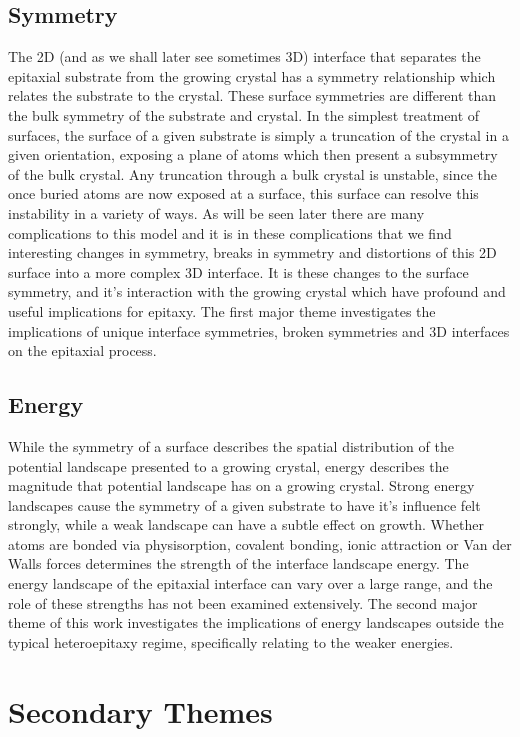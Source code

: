 \subsection{Symmetry} The 2D (and as we shall later see sometimes 3D) interface that separates the epitaxial substrate from the growing crystal has a symmetry relationship which relates the substrate to the crystal.
These surface symmetries are different than the bulk symmetry of the substrate and crystal.
In the simplest treatment of surfaces, the surface of a given substrate is simply a truncation of the crystal in a given orientation, exposing a plane of atoms which then present a subsymmetry of the bulk crystal.
Any truncation through a bulk crystal is unstable, since the once buried atoms are now exposed at a surface, this surface can resolve this instability in a variety of ways.
As will be seen later there are many complications to this model and it is in these complications that we find interesting changes in symmetry, breaks in symmetry and distortions of this 2D surface into a more complex 3D interface.
It is these changes to the surface symmetry, and it's interaction with the growing crystal which have profound and useful implications for epitaxy.
The first major theme investigates the implications of unique interface symmetries, broken symmetries and 3D interfaces on the epitaxial process.

\subsection{Energy} While the symmetry of a surface describes the spatial distribution of the potential landscape presented to a growing crystal, energy describes the magnitude that potential landscape has on a growing crystal.
Strong energy landscapes cause the symmetry of a given substrate to have it's influence felt strongly, while a weak landscape can have a subtle effect on growth.
Whether atoms are bonded via physisorption, covalent bonding, ionic attraction or Van der Walls forces determines the strength of the interface landscape energy.
The energy landscape of the epitaxial interface can vary over a large range, and the role of these strengths has not been examined extensively.
The second major theme of this work investigates the implications of energy landscapes outside the typical heteroepitaxy regime, specifically relating to the weaker energies.

\section{Secondary Themes}
